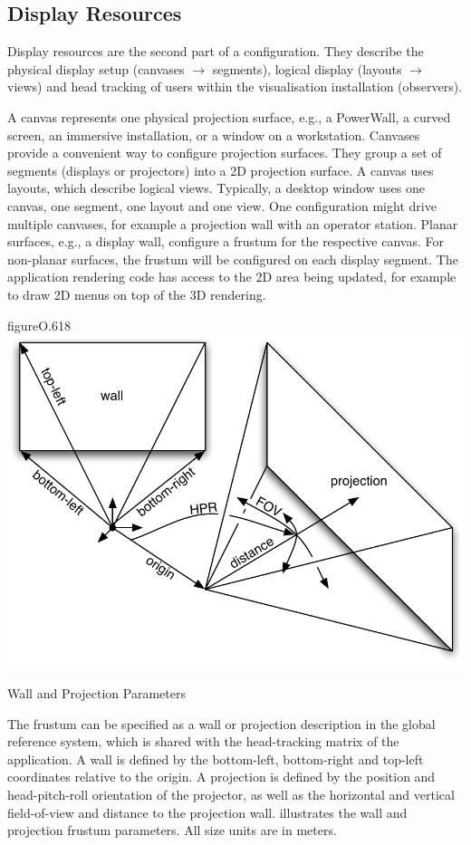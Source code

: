\subsection{Display Resources}

Display resources are the second part of a configuration. They describe the
physical display setup (canvases $\rightarrow$ segments), logical display
(layouts $\rightarrow$ views) and head tracking of users within the
visualisation installation (observers).

A \textsf{canvas} represents one physical projection surface, e.g., a
PowerWall, a curved screen, an immersive installation, or a window on a
workstation. Canvases provide a convenient way to configure projection
surfaces. They group a set of segments (displays or projectors) into a 2D
projection surface. A canvas uses layouts, which describe logical views.
Typically, a desktop window uses one canvas, one segment, one layout and one
view. One configuration might drive multiple canvases, for example a projection
wall with an operator station. Planar surfaces, e.g., a display wall, configure
a frustum for the respective canvas. For non-planar surfaces, the frustum will
be configured on each display segment. The application rendering code has
access to the 2D area being updated, for example to draw 2D menus on top of the
3D rendering.

\begin{wrapfloat}{figure}{O}{.618\textwidth}
 \includegraphics[width=.618\textwidth]{images/frusta.pdf}
 {\caption{\label{fFrusta}Wall and Projection Parameters}}
\end{wrapfloat}

The frustum can be specified as a wall or projection description in the global
reference system, which is shared with the head-tracking matrix of the
application. A wall is defined by the bottom-left, bottom-right and top-left
coordinates relative to the origin. A projection is defined by the position and
head-pitch-roll orientation of the projector, as well as the horizontal and
vertical field-of-view and distance to the projection wall. 
illustrates the wall and projection frustum parameters. All size units are in
meters.

